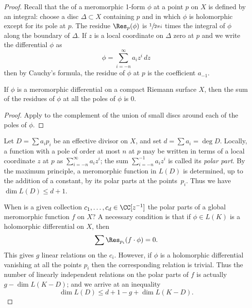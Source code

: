 \begin{proof}
%
Recall that the 
of a meromorphic 1-form $\phi$ at a
%
point $p$ on $X$ is defined by an integral: choose a disc $\Delta \subset X$ containing $p$ and in which $\phi$ is holomorphic except
for its pole at $p$. The residue $\Res_p(\phi)$ is $\sfrac{1}{2\pi i}$
times the integral of $\phi$ along the boundary of $\Delta$. If $z$ is
a local coordinate on $\Delta$ zero at $p$ and we write the
differential $\phi$ as
{\meshing
$$
\phi = \sum_{i=-n}^\infty \!a_iz^i \,dz
$$
then by Cauchy's formula, the residue of $\phi$ at $p$ is the coefficient $a_{-1}$. 
}

\begin{proposition}\label{residue sum}
 If $\phi$ is a meromorphic differential on a compact Riemann surface $X$, then the sum of the residues of $\phi$
 at all the poles of $\phi$ is $0$.
 \end{proposition}
 
\begin{proof}
Apply 
%
to the complement of the union of small discs around each of the poles of $\phi$.
\end{proof}

Let  $D = \sum a_ip_i$ be an effective divisor on $X$, and set $d = \sum a_i = \deg D$. Locally, a function with a pole of order at most $n$ at $p$ may be written in terms of a local coordinate $z$ at $p$ as $\sum_{i=-n}^\infty a_{i}z^{i} $;
the sum $\sum_{i=-n}^{-1} a_{i}z^{i}$ is called its \emph{polar part}.
By the maximum principle, a meromorphic function in $L(D)$ is determined, up to the addition of a constant, by its polar parts at the points~$p_i$. Thus we have $\dim L(D) \leq d+1$.
{\meshing\par}

When is a given collection $c_1,\dots,c_d \in \CC[z^{-1}]$ the polar parts of a global meromorphic function $f$ on $X$? A necessary condition
is that if $\phi \in L(K)$ is a holomorphic differential on $X$, then
$$
\sum \Res_{p_i}(f \cdot \phi) = 0.
$$
This gives $g$ linear relations on the $c_i$. However, if $\phi$ is a holomorphic differential vanishing at all the points $p_i$
then the corresponding relation is trivial. Thus the number of linearly independent relations on the polar parts of $f$ is actually $g - \dim L(K-D)$; and we arrive at an inequality
$$
\dim L(D) \leq d + 1 - g + \dim L(K-D).
$$


\end{proof}
